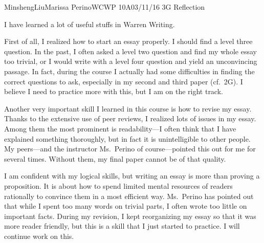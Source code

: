 \documentclass[12pt,letterpaper]{article}
\begin{document}
\begin{mla}{Minsheng}{Liu}{Marissa Perino}{WCWP 10A}{03/11/16}
  {3G Reflection}
  
I have learned a lot of useful stuffs in Warren Writing.

First of all, I realized how to start an essay properly. I should find a
level three question. In the past, I often asked a level two question
and find my whole essay too trivial, or I would write with a level four
question and yield an unconvincing passage. In fact, during the course I
actually had some difficulties in finding the correct questions to ask,
especially in my second and third paper (cf.~2G). I believe I need to
practice more with this, but I am on the right track.

Another very important skill I learned in this course is how to revise
my essay. Thanks to the extensive use of peer reviews, I realized lots
of issues in my essay. Among them the most prominent is readability---I
often think that I have explained something thoroughly, but in fact it
is unintelligible to other people. My peers---and the instructor
Ms.~Perino of course---pointed this out for me for several times.
Without them, my final paper cannot be of that quality.

I am confident with my logical skills, but writing an essay is more than
proving a proposition. It is about how to spend limited mental resources
of readers rationally to convince them in a most efficient way.
Ms.~Perino has pointed out that while I spent too many words on trivial
parts, I often wrote too little on important facts. During my revision,
I kept reorganizing my essay so that it was more reader friendly, but
this is a skill that I just started to practice. I will continue work on
this.

\end{mla}
\end{document}
